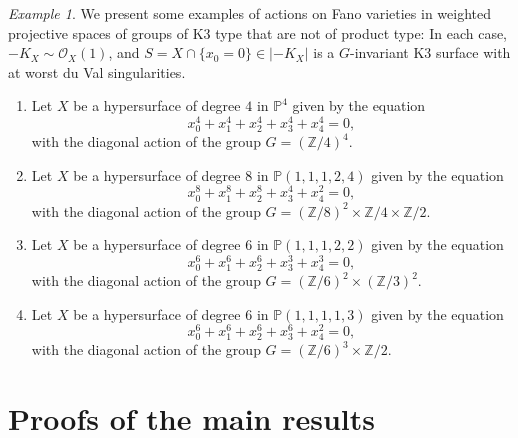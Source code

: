 \documentclass[11pt]{amsart}
\numberwithin{equation}{section}
\theoremstyle{definition}
\theoremstyle{remark}
\newtheorem{example}[thm]{Example}
\newcommand{\OOO}{\mathscr{O}}
\begin{document}
\begin{example}
\label{exam-k3-not-pt}
We present some examples of actions on Fano varieties in weighted projective spaces of groups of K3 type that are not of product type: 
In each case, $-K_X\sim\OOO_X(1)$, and $S=X\cap\{x_0=0\}\in|-K_X|$ is a $G$-invariant K3 surface with at worst du Val singularities.

\begin{enumerate}
\item  
Let $X$ be a hypersurface of degree $4$ in $\mathbb{P}^4$ given by the equation
\[
x_0^4 + x_1^4 + x_2^4 + x_3^4 + x_4^4 = 0,
\]
with the diagonal action of the group $G=(\mathbb{Z}/4)^4$.

\item 
Let $X$ be a hypersurface of degree $8$ in $\mathbb{P}(1, 1, 1, 2, 4)$ given by the equation
\[
x_0^8 + x_1^8 + x_2^8 + x_3^4 + x_4^2 = 0,
\]
with the diagonal action of the group $G=(\mathbb{Z}/8)^2\times\mathbb{Z}/4\times\mathbb{Z}/2$. 

\item
Let $X$ be a hypersurface of degree $6$ in $\mathbb{P}(1,1,1,2,2)$
given by the equation
\[
x_0^6 + x_1^6 + x_2^6 + x_3^3 + x_4^3 = 0,
\]
with the diagonal action of the group 
$G=(\mathbb{Z}/6)^2\times(\mathbb{Z}/3)^2$. 

\item
Let $X$ be a hypersurface of degree $6$ in $\mathbb{P}(1,1,1,1,3)$
given by the equation
\[
x_0^6 + x_1^6 + x_2^6 + x_3^6 + x_4^2 = 0,
\]
with the diagonal action of the group $G=(\mathbb{Z}/6)^3\times \mathbb{Z}/2$.  
\end{enumerate}
\end{example}

\section{Proofs of the main results}
\end{document}
